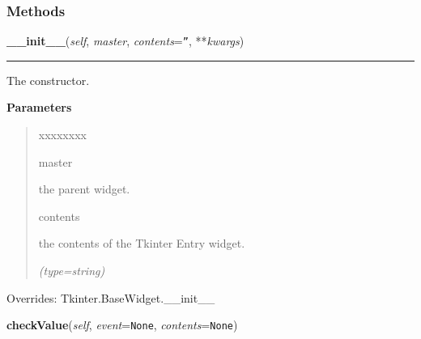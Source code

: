   \subsubsection{Methods}

    \vspace{0.5ex}

\hspace{.8\funcindent}\begin{boxedminipage}{\funcwidth}

    \raggedright \textbf{\_\_init\_\_}(\textit{self}, \textit{master}, \textit{contents}={\tt ''}, **\textit{kwargs})

    \vspace{-1.5ex}

    \rule{\textwidth}{0.5\fboxrule}
\setlength{\parskip}{2ex}
    The constructor.

\setlength{\parskip}{1ex}
      \textbf{Parameters}
      \vspace{-1ex}

      \begin{quote}
        \begin{Ventry}{xxxxxxxx}

          \item[master]

          the parent widget.

          \item[contents]

          the contents of the Tkinter Entry widget.

            {\it (type=string)}

        \end{Ventry}

      \end{quote}

      Overrides: Tkinter.BaseWidget.\_\_init\_\_

    \end{boxedminipage}

    \label{nMOLDYN:GUI:Widgets:ValidatingEntry:checkValue}

    \vspace{0.5ex}

\hspace{.8\funcindent}\begin{boxedminipage}{\funcwidth}

    \raggedright \textbf{checkValue}(\textit{self}, \textit{event}={\tt None}, \textit{contents}={\tt None})

\setlength{\parskip}{2ex}
\setlength{\parskip}{1ex}
    \end{boxedminipage}


